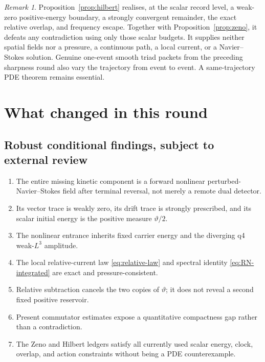 \documentclass[11pt]{article}
\theoremstyle{remark}
\newtheorem{remark}[theorem]{Remark}
\begin{document}
\begin{remark}
Proposition~\ref{prop:hilbert} realises, at the scalar record level, a
weak-zero positive-energy boundary, a strongly convergent remainder,
the exact relative overlap, and frequency escape.  Together with
Proposition~\ref{prop:zeno}, it defeats any contradiction using only
those scalar budgets.  It supplies neither spatial fields nor a pressure,
a continuous path, a local current, or a Navier--Stokes solution.  Genuine
one-event smooth triad packets from the preceding sharpness round also
vary the trajectory from event to event.  A same-trajectory PDE theorem
remains essential.
\end{remark}

\section{What changed in this round}

\subsection*{Robust conditional findings, subject to external review}

\begin{enumerate}
 \item The entire missing kinetic component is a forward nonlinear
 perturbed-Navier--Stokes field after terminal reversal, not merely a
 remote dual detector.
 \item Its vector trace is weakly zero, its drift trace is strongly
 prescribed, and its scalar initial energy is the positive measure
 \(\vartheta/2\).
 \item The nonlinear entrance inherits fixed carrier energy and the
 diverging q4 weak-\(L^3\) amplitude.
 \item The local relative-current law
 \eqref{eq:relative-law} and spectral identity
 \eqref{eq:RN-integrated} are exact and pressure-consistent.
 \item Relative subtraction cancels the two copies of
 \(\vartheta\); it does not reveal a second fixed positive reservoir.
 \item Present commutator estimates expose a quantitative compactness
 gap rather than a contradiction.
 \item The Zeno and Hilbert ledgers satisfy all currently used scalar
 energy, clock, overlap, and action constraints without being a PDE
 counterexample.
\end{enumerate}
\end{document}
